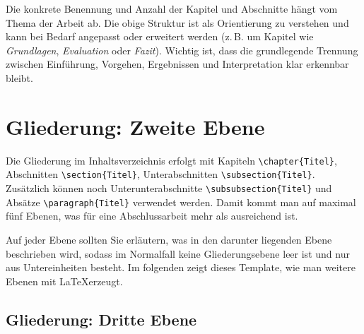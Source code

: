 Die konkrete Benennung und Anzahl der Kapitel und Abschnitte hängt vom Thema der Arbeit ab. 
Die obige Struktur ist als Orientierung zu verstehen und kann bei Bedarf angepasst oder 
erweitert werden (z.\,B. um Kapitel wie \textit{Grundlagen}, \textit{Evaluation} oder 
\textit{Fazit}). Wichtig ist, dass die grundlegende Trennung zwischen Einführung, Vorgehen, 
Ergebnissen und Interpretation klar erkennbar bleibt.

\section{Gliederung: Zweite Ebene}

Die Gliederung im Inhaltsverzeichnis erfolgt mit Kapiteln \verb+\chapter{Titel}+, Abschnitten \verb+\section{Titel}+, Unterabschnitten \verb+\subsection{Titel}+. Zusätzlich können noch Unterunterabschnitte \verb+\subsubsection{Titel}+ und Absätze \verb+\paragraph{Titel}+ verwendet werden. Damit kommt man auf maximal fünf Ebenen, was für eine Abschlussarbeit mehr als ausreichend ist.

Auf jeder Ebene sollten Sie erläutern, was in den darunter liegenden Ebene beschrieben wird, sodass im Normalfall keine Gliederungsebene leer ist und nur aus Untereinheiten besteht. Im folgenden zeigt dieses Template, wie man weitere Ebenen mit \LaTeX erzeugt.

\subsection{Gliederung: Dritte Ebene}

